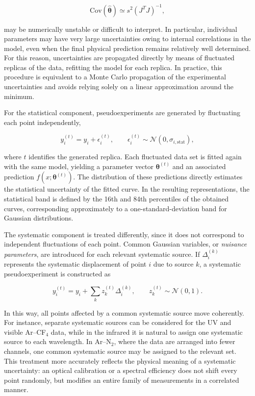 \documentclass[12pt,a4paper]{article}
\begin{document}
\begin{equation*}
\mathrm{Cov}(\hat{\boldsymbol{\theta}})
\simeq
s^2(J^TJ)^{-1},
\end{equation*}

may be numerically unstable or difficult to interpret. In particular, individual parameters may have very large uncertainties owing to internal correlations in the model, even when the final physical prediction remains relatively well determined. For this reason, uncertainties are propagated directly by means of fluctuated replicas of the data, refitting the model for each replica. In practice, this procedure is equivalent to a Monte Carlo propagation of the experimental uncertainties and avoids relying solely on a linear approximation around the minimum.

For the statistical component, pseudoexperiments are generated by fluctuating each point independently,

\begin{equation*}
y_i^{(t)}
=
y_i
+
\epsilon_i^{(t)},
\qquad
\epsilon_i^{(t)}
\sim
\mathcal{N}(0,\sigma_{i,\mathrm{stat}}),
\end{equation*}

where $t$ identifies the generated replica. Each fluctuated data set is fitted again with the same model, yielding a parameter vector $\boldsymbol{\theta}^{(t)}$ and an associated prediction $f(x;\boldsymbol{\theta}^{(t)})$. The distribution of these predictions directly estimates the statistical uncertainty of the fitted curve. In the resulting representations, the statistical band is defined by the 16th and 84th percentiles of the obtained curves, corresponding approximately to a one-standard-deviation band for Gaussian distributions.

The systematic component is treated differently, since it does not correspond to independent fluctuations of each point. Common Gaussian variables, or \textit{nuisance parameters}, are introduced for each relevant systematic source. If $\Delta_i^{(k)}$ represents the systematic displacement of point $i$ due to source $k$, a systematic pseudoexperiment is constructed as

\begin{equation*}
y_i^{(t)}
=
y_i
+
\sum_k z_k^{(t)}\Delta_i^{(k)},
\qquad
z_k^{(t)}
\sim
\mathcal{N}(0,1).
\end{equation*}

In this way, all points affected by a common systematic source move coherently. For instance, separate systematic sources can be considered for the UV and visible Ar--CF$_4$ data, while in the infrared it is natural to assign one systematic source to each wavelength. In Ar--N$_2$, where the data are arranged into fewer channels, one common systematic source may be assigned to the relevant set. This treatment more accurately reflects the physical meaning of a systematic uncertainty: an optical calibration or a spectral efficiency does not shift every point randomly, but modifies an entire family of measurements in a correlated manner.
\end{document}

